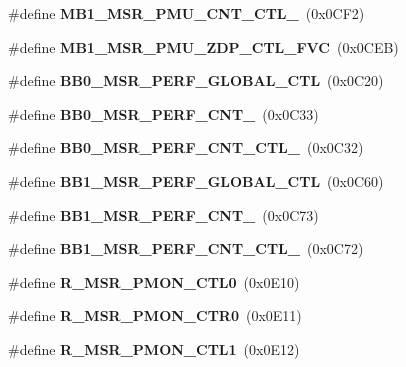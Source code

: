 \begin{DoxyCompactItemize}
\item 
\#define {\bfseries M\+B1\+\_\+\+M\+S\+R\+\_\+\+P\+M\+U\+\_\+\+C\+N\+T\+\_\+\+C\+T\+L\+\_}~(0x0\+C\+F2)\label{types_8h_a5d10d73c3cadef48250f288b4deae7f4}

\item 
\#define {\bfseries M\+B1\+\_\+\+M\+S\+R\+\_\+\+P\+M\+U\+\_\+\+Z\+D\+P\+\_\+\+C\+T\+L\+\_\+\+F\+VC}~(0x0\+C\+E\+B)\label{types_8h_a3dc9c0af51020d80f04cd959628a6fe4}

\item 
\#define {\bfseries B\+B0\+\_\+\+M\+S\+R\+\_\+\+P\+E\+R\+F\+\_\+\+G\+L\+O\+B\+A\+L\+\_\+\+C\+TL}~(0x0\+C20)\label{types_8h_a96724c63333fd75d0b4f6df6f15c00cc}

\item 
\#define {\bfseries B\+B0\+\_\+\+M\+S\+R\+\_\+\+P\+E\+R\+F\+\_\+\+C\+N\+T\+\_}~(0x0\+C33)\label{types_8h_a4b97b6b3bcbaff8c0b586f39950c6843}

\item 
\#define {\bfseries B\+B0\+\_\+\+M\+S\+R\+\_\+\+P\+E\+R\+F\+\_\+\+C\+N\+T\+\_\+\+C\+T\+L\+\_}~(0x0\+C32)\label{types_8h_a25fee148c332891795513f9b1a05cffa}

\item 
\#define {\bfseries B\+B1\+\_\+\+M\+S\+R\+\_\+\+P\+E\+R\+F\+\_\+\+G\+L\+O\+B\+A\+L\+\_\+\+C\+TL}~(0x0\+C60)\label{types_8h_aabcec1d26741254e752a93e1804ff3b5}

\item 
\#define {\bfseries B\+B1\+\_\+\+M\+S\+R\+\_\+\+P\+E\+R\+F\+\_\+\+C\+N\+T\+\_}~(0x0\+C73)\label{types_8h_a33e4ec281632da2dc617bc5d5178acc4}

\item 
\#define {\bfseries B\+B1\+\_\+\+M\+S\+R\+\_\+\+P\+E\+R\+F\+\_\+\+C\+N\+T\+\_\+\+C\+T\+L\+\_}~(0x0\+C72)\label{types_8h_acd0d76fc99515638469c45af914911fd}

\item 
\#define {\bfseries R\+\_\+\+M\+S\+R\+\_\+\+P\+M\+O\+N\+\_\+\+C\+T\+L0}~(0x0\+E10)\label{types_8h_af59d8541df8e5d53dc246d82d2a1d308}

\item 
\#define {\bfseries R\+\_\+\+M\+S\+R\+\_\+\+P\+M\+O\+N\+\_\+\+C\+T\+R0}~(0x0\+E11)\label{types_8h_aca5c935e94f63573a1952360d27cd292}

\item 
\#define {\bfseries R\+\_\+\+M\+S\+R\+\_\+\+P\+M\+O\+N\+\_\+\+C\+T\+L1}~(0x0\+E12)\label{types_8h_adc34ee61f18fe9ea31afab3bc2a051ff}


\end{DoxyCompactItemize}
